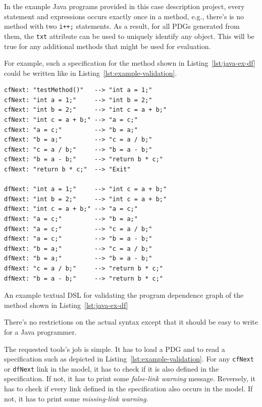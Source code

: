 \documentclass[11pt]{article}
\begin{document}
In the example Java programs provided in this case description project, every
statement and expressions occurs exactly once in a method, e.g., there's is no
method with two \verb|i++;| statements.  As a result, for all PDGs generated
from them, the \verb|txt| attribute can be used to uniquely identify any
object.  This will be true for any additional methods that might be used for
evaluation.

For example, such a specification for the method shown in
Listing~\ref{lst:java-ex-df} could be written like in
Listing~\ref{lst:example-validation}.

\begin{listing}
\begin{verbatim}
cfNext: "testMethod()"   --> "int a = 1;"
cfNext: "int a = 1;"     --> "int b = 2;"
cfNext: "int b = 2;"     --> "int c = a + b;"
cfNext: "int c = a + b;" --> "a = c;"
cfNext: "a = c;"         --> "b = a;"
cfNext: "b = a;"         --> "c = a / b;"
cfNext: "c = a / b;"     --> "b = a - b;"
cfNext: "b = a - b;"     --> "return b * c;"
cfNext: "return b * c;"  --> "Exit"

dfNext: "int a = 1;"     --> "int c = a + b;"
dfNext: "int b = 2;"     --> "int c = a + b;"
dfNext: "int c = a + b;" --> "a = c;"
dfNext: "a = c;"         --> "b = a;"
dfNext: "a = c;"         --> "c = a / b;"
dfNext: "a = c;"         --> "b = a - b;"
dfNext: "b = a;"         --> "c = a / b;"
dfNext: "b = a;"         --> "b = a - b;"
dfNext: "c = a / b;"     --> "return b * c;"
dfNext: "b = a - b;"     --> "return b * c;"
\end{verbatim}
  \caption{An example textual DSL for validating the program dependence graph
    of the method shown in Listing~\ref{lst:java-ex-df}}
  \label{lst:example-validation}
\end{listing}

There's no restrictions on the actual syntax except that it should be easy to
write for a Java programmer.

The requested tools's job is simple.  It has to load a PDG and to read a
specification such as depicted in Listing~\ref{lst:example-validation}.  For
any \verb|cfNext| or \verb|dfNext| link in the model, it has to check if it is
also defined in the specification.  If not, it has to print some
\emph{false-link warning} message.  Reversely, it has to check if every link
defined in the specification also occurs in the model.  If not, it has to print
some \emph{missing-link warning}.
\end{document}

